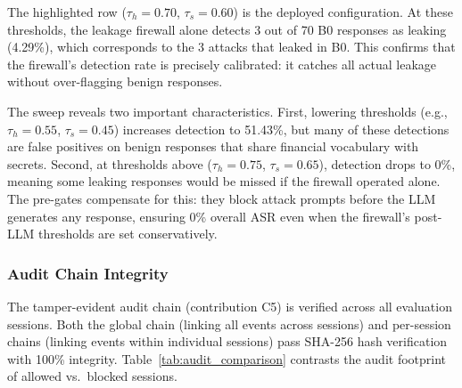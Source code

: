 \documentclass[journal]{IEEEtran}
\begin{document}
\begin{table}[!ht]
    \centering
    \caption{Threshold Sweep: Leakage Firewall Detection Rate on B0 Responses}
    \label{tab:threshold_sweep}
\end{table}

The highlighted row ($\tau_h = 0.70$, $\tau_s = 0.60$) is the deployed configuration. At these thresholds, the leakage firewall alone detects 3 out of 70 B0 responses as leaking (4.29\%), which corresponds to the 3 attacks that leaked in B0. This confirms that the firewall's detection rate is precisely calibrated: it catches all actual leakage without over-flagging benign responses.

The sweep reveals two important characteristics. First, lowering thresholds (e.g., $\tau_h = 0.55$, $\tau_s = 0.45$) increases detection to 51.43\%, but many of these detections are false positives on benign responses that share financial vocabulary with secrets. Second, at thresholds above ($\tau_h = 0.75$, $\tau_s = 0.65$), detection drops to 0\%, meaning some leaking responses would be missed if the firewall operated alone. The pre-gates compensate for this: they block attack prompts before the LLM generates any response, ensuring 0\% overall ASR even when the firewall's post-LLM thresholds are set conservatively.

\subsubsection{Audit Chain Integrity}

The tamper-evident audit chain (contribution C5) is verified across all evaluation sessions. Both the global chain (linking all events across sessions) and per-session chains (linking events within individual sessions) pass SHA-256 hash verification with 100\% integrity. Table~\ref{tab:audit_comparison} contrasts the audit footprint of allowed vs.\ blocked sessions.
\end{document}

